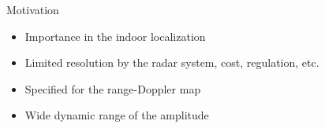 \documentclass{beamer}
\begin{document}
\begin{frame}[t]{Motivation}

    \begin{itemize}
        \item<2-> Importance in the indoor localization
    	\item<2-> Limited resolution by the radar system, cost, regulation, etc.
        \item<2-> Specified for the range-Doppler map
        \item<2-> Wide dynamic range of the amplitude
    \end{itemize}

    \vfill

\end{frame}
\end{document}
